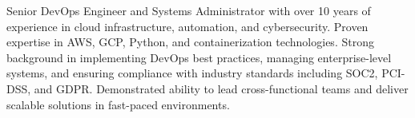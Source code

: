 Senior DevOps Engineer and Systems Administrator with over 10 years of experience in cloud infrastructure, automation, and cybersecurity. Proven expertise in AWS, GCP, Python, and containerization technologies. Strong background in implementing DevOps best practices, managing enterprise-level systems, and ensuring compliance with industry standards including SOC2, PCI-DSS, and GDPR. Demonstrated ability to lead cross-functional teams and deliver scalable solutions in fast-paced environments.

\vspace{6pt}